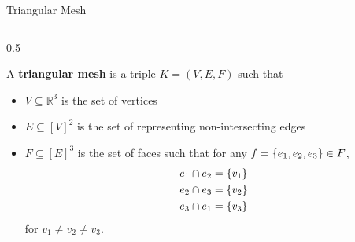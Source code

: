 \documentclass{beamer}
\begin{document}
\begin{frame}{Triangular Mesh}
    \begin{columns}
    \begin{column}{0.5\pagewidth}
        \begin{definition}
            A \textbf{triangular mesh} is a triple $K = (V, E, F)$ such that
            \begin{itemize}
                \item<2-> $V \subseteq \mathbb{R}^3$ is the set of vertices
                \item<3-> $E \subseteq [V]^2$ is the set of representing non-intersecting edges
                \item<4-> $F \subseteq [E]^3$ is the set of faces such that for any $f = \qty{e_1, e_2, e_3} \in F$, 
                    \begin{align*}
                        e_1 \cap e_2 &= \qty{v_1} \\
                        e_2 \cap e_3 &= \qty{v_2} \\
                        e_3 \cap e_1 &= \qty{v_3}
                    \end{align*}
                    for $v_1 \neq v_2 \neq v_3$. 
            \end{itemize}
        \end{definition}
    \end{column}


\end{columns}
\end{frame}
\end{document}
